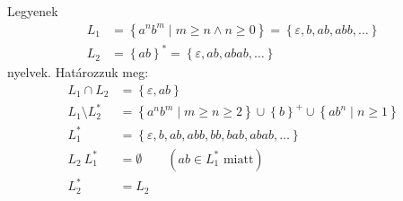 \subsubsection{}
Legyenek
\begin{align*}
	L_1 &= \left\lbrace a^nb^m \; | \; m \ge n \land n \ge 0 \right\rbrace = \left\lbrace \varepsilon, b, ab, abb, \dots \right\rbrace  \\
	L_2 &= \left\lbrace ab \right\rbrace^* = \left\lbrace \varepsilon, ab, abab, \dots \right\rbrace 
\end{align*}
nyelvek. Határozzuk meg:
\begin{align*}
	L_1 \cap L_2 &= \left\lbrace \varepsilon, ab \right\rbrace \\
	L_1 \setminus L_2^* &= \left\lbrace a^nb^m \; | \; m \ge n \ge 2 \right\rbrace \cup \left\lbrace b \right\rbrace^+ \cup \left\lbrace ab^n \; | \; n \ge 1 \right\rbrace \\
	L_1^* &= \left\lbrace \varepsilon, b, ab, abb, bb, bab, abab, \dots \right\rbrace \\
	L_2 \ L_1^* &= \emptyset \qquad (ab \in L_1^* \text{ miatt}) \\
	L_2^* &= L_2
\end{align*}